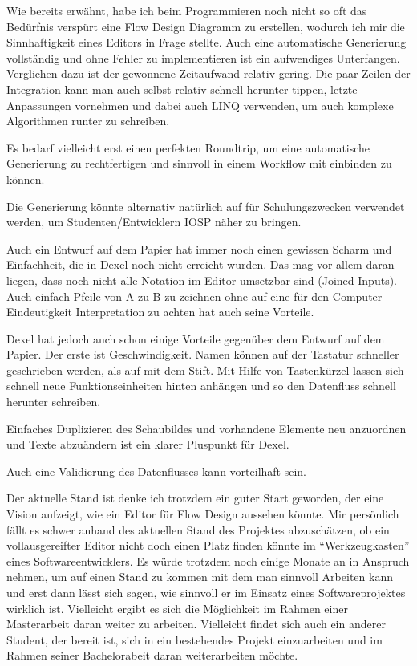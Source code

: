 Wie bereits erwähnt, habe ich beim Programmieren noch nicht so oft das Bedürfnis verspürt eine Flow Design Diagramm zu erstellen, wodurch ich mir die Sinnhaftigkeit eines Editors in Frage stellte.
Auch eine automatische Generierung  vollständig und ohne Fehler zu implementieren ist ein aufwendiges Unterfangen. Verglichen dazu ist der gewonnene Zeitaufwand  relativ gering. Die paar Zeilen der Integration kann man auch selbst relativ schnell herunter tippen, letzte Anpassungen vornehmen und dabei  auch LINQ  verwenden, um  auch komplexe Algorithmen runter zu schreiben.

 Es bedarf vielleicht erst einen perfekten Roundtrip, um eine automatische Generierung zu rechtfertigen und sinnvoll in einem Workflow mit einbinden zu können.
 
 Die Generierung könnte alternativ natürlich auf für Schulungszwecken verwendet werden, um Studenten/Entwicklern IOSP näher zu bringen.
 
Auch ein Entwurf auf dem Papier hat immer noch einen gewissen Scharm und Einfachheit, die in Dexel noch nicht erreicht wurden.
Das mag vor allem daran liegen, dass noch nicht alle Notation im Editor umsetzbar sind (Joined Inputs). 
Auch einfach Pfeile von A zu B zu zeichnen ohne auf eine für den Computer Eindeutigkeit Interpretation zu achten hat auch seine Vorteile.

Dexel hat jedoch auch schon einige Vorteile gegenüber dem Entwurf auf dem Papier. Der erste ist Geschwindigkeit. 
Namen können auf der Tastatur schneller geschrieben werden, als auf mit dem Stift. Mit Hilfe von Tastenkürzel lassen sich schnell neue Funktionseinheiten hinten anhängen und so den Datenfluss schnell herunter schreiben.

Einfaches Duplizieren des Schaubildes und vorhandene Elemente neu anzuordnen und Texte abzuändern ist ein klarer Pluspunkt für Dexel.

Auch eine Validierung des Datenflusses kann vorteilhaft sein.



Der aktuelle Stand ist denke ich trotzdem ein guter Start geworden, der eine Vision aufzeigt, wie ein Editor für Flow Design aussehen könnte.
Mir persönlich fällt es schwer anhand des aktuellen Stand des Projektes abzuschätzen, ob ein vollausgereifter Editor nicht doch einen  Platz finden könnte im \enquote{Werkzeugkasten} eines Softwareentwicklers.
 Es würde trotzdem noch einige Monate an in Anspruch nehmen,  um auf einen Stand zu kommen mit dem man sinnvoll Arbeiten kann und erst dann lässt sich sagen, wie sinnvoll er im Einsatz eines Softwareprojektes wirklich ist.
  Vielleicht ergibt es sich die Möglichkeit  im Rahmen einer Masterarbeit daran weiter zu arbeiten. Vielleicht findet sich auch  ein anderer Student, der bereit ist, sich in ein bestehendes Projekt einzuarbeiten und im Rahmen seiner Bachelorabeit daran weiterarbeiten möchte.



